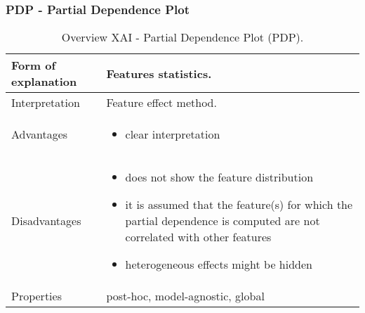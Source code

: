 \subsubsection{PDP - Partial Dependence Plot}
\begin{table}[H]
  \centering
  \begin{tabular}{|p{}|p{}|}
    \hline
    Form of \newline explanation & 
    Features statistics. \\
    
    \hline
    Interpretation & 
    Feature effect method.\\
    \hline
    Advantages &
    \begin{itemize}[nosep, left=0em]
        \item clear interpretation
    \end{itemize} \\
    
    \hline
    Disadvantages &
    \begin{itemize}[nosep, left=0em]
        \item does not show the feature distribution
        \item it is assumed that the feature(s) for which the partial dependence is computed are not correlated with other features
        \item heterogeneous effects might be hidden
    \end{itemize} \\
    
    \hline
    Properties & 
    post-hoc, model-agnostic, global  \\
    
    \hline
  \end{tabular}
  \caption{Overview XAI - Partial Dependence Plot (PDP).}
  \label{tab:XAIPDP}
\end{table}


